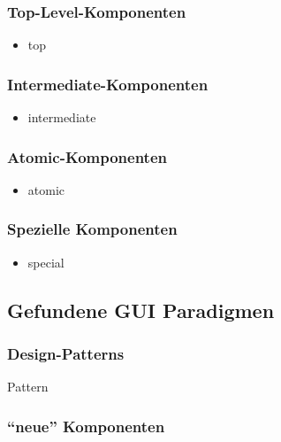   \subsubsection{Top-Level-Komponenten}
  
  \begin{itemize}
    \item top
  \end{itemize}
  
  \subsubsection{Intermediate-Komponenten}
  
  \begin{itemize}
    \item intermediate
  \end{itemize}
  
  \subsubsection{Atomic-Komponenten}
  
  \begin{itemize}
    \item atomic
  \end{itemize}
  
  \subsubsection{Spezielle Komponenten}
    
  \begin{itemize}
    \item special
  \end{itemize}
  
  \subsection{Gefundene GUI Paradigmen}
    
  \subsubsection{Design-Patterns}
  
  \begin{description}
    \item[Pattern]
  \end{description}
  
  \subsubsection{``neue'' Komponenten}
  
